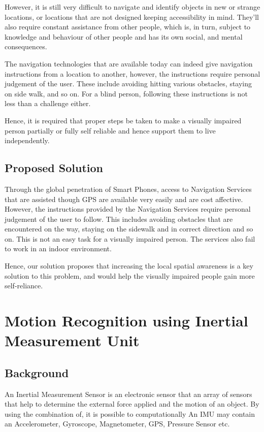 \documentclass[
10pt, %
a4paper, %
oneside, %
headinclude,footinclude, %
BCOR5mm, %
]{scrartcl}
\begin{document}
However, it is still very difficult to navigate and identify objects in new or strange locations, or locations that are not designed keeping accessibility in mind. They’ll also require constant assistance from other people, which is, in turn, subject to knowledge and behaviour of other people and has its own social, and mental consequences.

The navigation technologies that are available today can indeed give navigation instructions from a location to another, however, the instructions require personal judgement of the user. These include avoiding hitting various obstacles, staying on side walk, and so on. For a blind person, following these instructions is not less than a challenge either.

Hence, it is required that proper steps be taken to make a visually impaired person partially or fully self reliable and hence support them to live independently. 

\subsection{Proposed Solution}
Through the global penetration of Smart Phones, access to Navigation Services that are assisted though GPS are available very easily and are cost affective. However, the instructions provided by the Navigation Services require personal judgement of the user to follow. This includes avoiding obstacles that are encountered on the way, staying on the sidewalk and in correct direction and so on. This is not an easy task for a visually impaired person. The services also fail to work in an indoor environment.

Hence, our solution proposes that increasing the local spatial awareness is a key solution to this problem, and would help the visually impaired people gain more self-reliance. 

\section{Motion Recognition using Inertial Measurement Unit}
\subsection{Background}
An Inertial Measurement Sensor is an electronic sensor that 
an array of sensors that help to determine the external force applied and the motion of an object. By using the combination of, it is possible to computationally
An IMU may contain an Accelerometer, Gyroscope, Magnetometer, GPS, Pressure Sensor etc.
\end{document}
